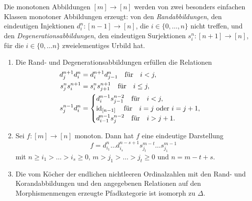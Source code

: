 Die monotonen Abbildungen $[m] \to [n]$ werden von zwei besonders
einfachen Klassen monotoner Abbildungen erzeugt: von den
\emph{Randabbildungen}, den eindeutigen Injektionen $d_i^n: [n - 1] \to [n]$,
die $i \in \{0, \dots, n\}$ nicht treffen, und den
\emph{Degenerationsabbildungen}, den eindeutigen Surjektionen $s_i^n: [n +
1] \to [n]$, für die $i \in \{0, \dots n\}$ zweielementiges Urbild
hat.

\begin{lemma}[\cite{GM}, I.2, ex. 1] \label{face-gen}

  \begin{enumerate}[label=(\roman*)] \item \label{itm:face-gen-rel}
  Die Rand- und Degenerationsabbildungen er\-fül\-len die Relationen
  \begin{align*}
    d_j^{n+1} d_i^n &= d_i^{n+1} d_{j-1}^n \quad \text{für} \quad i < j, \\
    s_j^n s_i^{n+1} &= s_i^n s_{j+1}^{n+1} \quad \text{für} \quad i \leq j, \\
    s_j^{n-1} d_i^n &=
    \begin{cases}
    d_i^{n-1} s_{j-1}^{n-2} \quad \text{für} \quad i < j, \\
    \operatorname{id}_{[n-1]} \quad \text{für} \quad i = j \text{ oder } i = j+1, \\
    d_{i-1}^{n-1} s_j^{n-2} \quad \text{für} \quad i > j + 1.
    \end{cases}
  \end{align*}
 
  \item \label{itm:face-gen-form} Sei $f: [m] \to [n]$ monoton. Dann
  hat $f$ eine eindeutige Darstellung
  \[ f = d_{i_1}^n \dots d_{i_s}^{n-s+1} s_{j_t}^{m-t} \dots s_{j_1}^{m-1} \]
  mit $n \geq i_1 > \dots > i_s \geq 0$, $m > j_1 > \dots > j_t \geq
  0$ und $n = m-t+s$.
    
  \item \label{itm:face-gen-cat} Die vom Köcher der endlichen
  nichtleeren Ordinalzahlen mit den Rand- und Korandabbildungen und
  den angegebenen Relationen auf den Morphismenmengen erzeugte
  Pfadkategorie ist isomorph zu $\Delta$.
\end{enumerate}
\end{lemma}
